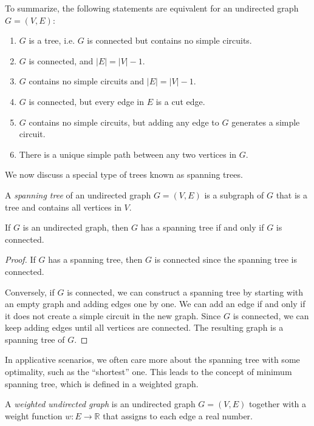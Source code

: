 To summarize, the following statements are equivalent for an undirected graph $G=(V,E)$:
\begin{enumerate}[itemindent=0ex, itemsep=0pt, label=\upshape{(\alph*)}]
    \item $G$ is a tree, i.e. $G$ is connected but contains no simple circuits.
    \item $G$ is connected, and $|E|=|V|-1$.
    \item $G$ contains no simple circuits and $|E| = |V|-1$.
    \item $G$ is connected, but every edge in $E$ is a cut edge.
    \item $G$ contains no simple circuits, but adding any edge to $G$ generates a simple circuit.
    \item There is a unique simple path between any two vertices in $G$.
\end{enumerate}

We now discuss a special type of trees known as spanning trees. 

\begin{definition}
    A \emph{spanning tree} of an undirected graph $G=(V,E)$ is a subgraph of $G$ that is a tree and contains all vertices in $V$.
\end{definition}

\begin{theorem}
    If $G$ is an undirected graph, then $G$ has a spanning tree if and only if $G$ is connected.
\end{theorem}

\begin{proof}
    If $G$ has a spanning tree, then $G$ is connected since the spanning tree is connected. 

    Conversely, if $G$ is connected, we can construct a spanning tree by starting with an empty graph and adding edges one by one. We can add an edge if and only if it does not create a simple circuit in the new graph. Since $G$ is connected, we can keep adding edges until all vertices are connected. The resulting graph is a spanning tree of $G$.
\end{proof}

In applicative scenarios, we often care more about the spanning tree with some optimality, such as the ``shortest'' one. This leads to the concept of minimum spanning tree, which is defined in a weighted graph. 

\begin{definition}
    A \emph{weighted undirected graph} is an undirected graph $G=(V,E)$ together with a weight function $w\colon E\to\mathbb{R}$ that assigns to each edge a real number.
\end{definition}

